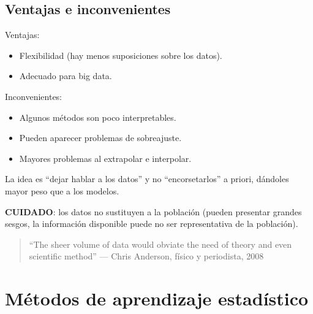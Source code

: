 \documentclass[]{book}
\begin{document}
\subsection{Ventajas e inconvenientes}\label{ventajas-e-inconvenientes}

Ventajas:

\begin{itemize}
\item
  Flexibilidad (hay menos suposiciones sobre los datos).
\item
  Adecuado para big data.
\end{itemize}

Inconvenientes:

\begin{itemize}
\item
  Algunos métodos son poco interpretables.
\item
  Pueden aparecer problemas de sobreajuste.
\item
  Mayores problemas al extrapolar e interpolar.
\end{itemize}

La idea es ``dejar hablar a los datos'' y no ``encorsetarlos'' a priori,
dándoles mayor peso que a los modelos.

\textbf{CUIDADO}: los datos no sustituyen a la población (pueden
presentar grandes sesgos, la información disponible puede no ser
representativa de la población).

\begin{quote}
``The sheer volume of data would obviate the need of theory and even
scientific method'' --- Chris Anderson, físico y periodista, 2008
\end{quote}

\section{Métodos de aprendizaje
estadístico}\label{muxe9todos-de-aprendizaje-estaduxedstico}
\end{document}
